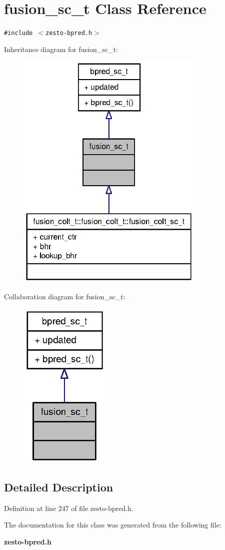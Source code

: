\section{fusion\_\-sc\_\-t Class Reference}
\label{classfusion__sc__t}
{\tt \#include $<$zesto-bpred.h$>$}

Inheritance diagram for fusion\_\-sc\_\-t:\nopagebreak
\begin{figure}[H]
\begin{center}
\leavevmode
\includegraphics[width=254pt]{classfusion__sc__t__inherit__graph}
\end{center}
\end{figure}
Collaboration diagram for fusion\_\-sc\_\-t:\nopagebreak
\begin{figure}[H]
\begin{center}
\leavevmode
\includegraphics[width=122pt]{classfusion__sc__t__coll__graph}
\end{center}
\end{figure}


\subsection{Detailed Description}


Definition at line 247 of file zesto-bpred.h.

The documentation for this class was generated from the following file:\begin{CompactItemize}
\item 
{\bf zesto-bpred.h}\end{CompactItemize}
